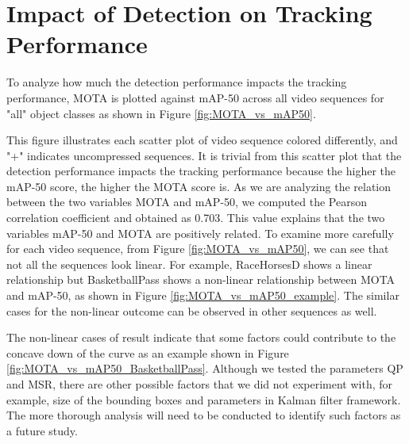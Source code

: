 \section{Impact of Detection on Tracking Performance}
\label{sec:results/section_c}

To analyze how much the detection performance impacts the tracking performance, MOTA is plotted against mAP-50 across all video sequences for "all" object classes as shown in Figure \ref{fig:MOTA_vs_mAP50}.

This figure illustrates each scatter plot of video sequence colored differently, and "+" indicates uncompressed sequences. It is trivial from this scatter plot that the detection performance impacts the tracking performance because the higher the mAP-50 score, the higher the MOTA score is. As we are analyzing the relation between the two variables MOTA and mAP-50, we computed the Pearson correlation coefficient and obtained as 0.703. This value explains that the two variables mAP-50 and MOTA are positively related. To examine more carefully for each video sequence, from Figure \ref{fig:MOTA_vs_mAP50}, we can see that not all the sequences look linear. For example, RaceHorsesD shows a linear relationship but BasketballPass shows a non-linear relationship between MOTA and mAP-50, as shown in Figure \ref{fig:MOTA_vs_mAP50_example}. The similar cases for the non-linear outcome can be observed in other sequences as well. 

The non-linear cases of result indicate that some factors could contribute to the concave down of the curve as an example shown in Figure \ref{fig:MOTA_vs_mAP50_BasketballPass}. Although we tested the parameters QP and MSR, there are other possible factors that we did not experiment with, for example, size of the bounding boxes and parameters in Kalman filter framework. The more thorough analysis will need to be conducted to identify such factors as a future study.